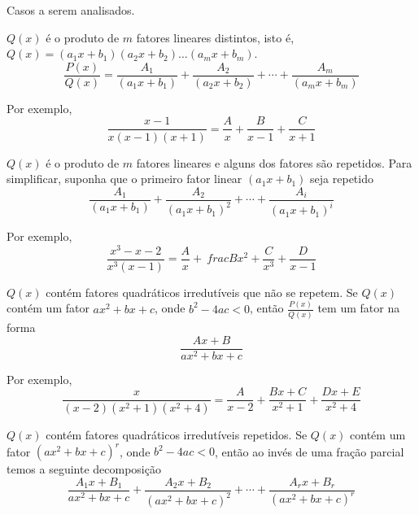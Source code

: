 Casos a serem analisados.

\begin{theory}[Caso 1]
  $Q(x)$ é o produto de $m$ fatores lineares distintos, isto é,
  $Q(x)=(a_1x+b_1)(a_2x+b_2)\dots(a_mx+b_m)$.
  \[
    \frac{P(x)}{Q(x)}
    = \frac{A_1}{(a_1x+b_1)}
    + \frac{A_2}{(a_2x+b_2)}
    + \cdots
    + \frac{A_m}{(a_mx+b_m)}
  \]
\end{theory}

Por exemplo,
\[
  \frac{x-1}{x(x-1)(x+1)}= \frac{A}{x}+ \frac{B}{x-1}+ \frac{C}{x+1}
\]

\begin{theory}[Caso 2]
  $Q(x)$ é o produto de $m$ fatores lineares e alguns dos
  fatores são repetidos. Para simplificar, suponha que o primeiro
  fator linear $(a_1x+b_1)$ seja repetido
  \[
    \frac{A_1}{(a_1x+b_1)}
    + \frac{A_2}{(a_1x+b_1)^2}
    + \cdots
    + \frac{A_i}{(a_1x+b_1)^i}
  \]
\end{theory}

Por exemplo,
\[
  \frac{x^3-x-2}{x^3(x-1)}
  = \frac{A}{x}
  +\ frac{B}{x^2}
  + \frac{C}{x^3}
  + \frac{D}{x-1}
\]

\begin{theory}[Caso 3]
  $Q(x)$ contém fatores quadráticos irredutíveis que não se repetem.
  Se $Q(x)$ contém um fator $ax^2+bx+c$, onde $b^2-4ac<0$,
  então $\frac{P(x)}{Q(x)}$ tem um fator na forma
  \[
    \frac{Ax+B}{ax^2+bx+c}
  \]
\end{theory}

Por exemplo,
\[
  \frac{x}{(x-2)(x^2+1)(x^2+4)}
  = \frac{A}{x-2}
  + \frac{Bx+C}{x^2+1}
  + \frac{Dx+E}{x^2+4}
\]

\begin{theory}[Caso 4]
  $Q(x)$ contém fatores quadráticos irredutíveis repetidos.
  Se $Q(x)$ contém um fator $(ax^2+bx+c)^r$, onde $b^2-4ac<0$,
  então ao invés de uma fração parcial temos a seguinte decomposição
  \[
    \frac{A_1x+B_1}{ax^2+bx+c}
    + \frac{A_2x+B_2}{(ax^2+bx+c)^2}
    + \cdots
    + \frac{A_rx+B_r}{(ax^2+bx+c)^r}
  \]
\end{theory}


